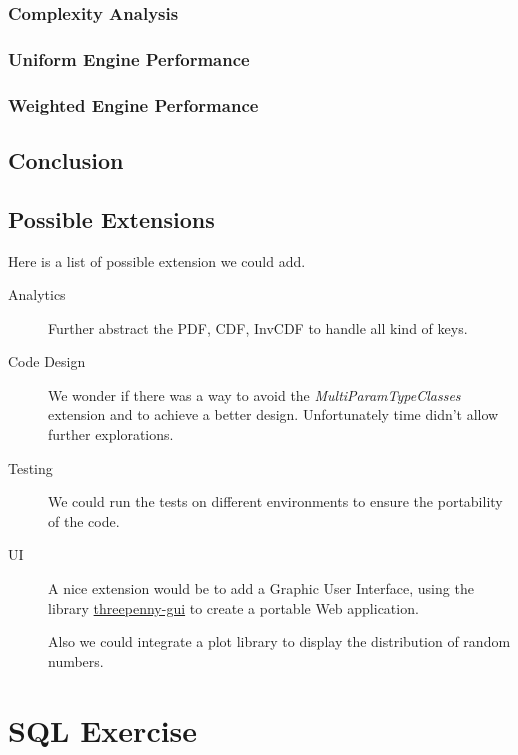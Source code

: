\documentclass[12pt,a4paper,article]{memoir} %
\begin{document}
\subsection{Complexity Analysis}

\subsection{Uniform Engine Performance}

\subsection{Weighted Engine Performance}

\section{Conclusion}

\section{Possible Extensions}
Here is a list of possible extension we could add.
\begin{description}
	\item [Analytics]
	Further abstract the PDF, CDF, InvCDF to handle all kind of keys.
	\item [Code Design]
	We wonder if there was a way to avoid the \emph{MultiParamTypeClasses}
	extension and to achieve a better design. 
	Unfortunately time didn't allow further explorations.
	\item [Testing]
	We could run the tests on different environments to ensure the portability of 
	the code.
	\item [UI] 
	A nice extension would be to add a Graphic User Interface,
	using the library 
	\href{https://hackage.haskell.org/package/threepenny-gui}{threepenny-gui}
	to create a portable Web application. 

	Also we could integrate a plot library to display the distribution of 
	random numbers.
\end{description}

\newpage
\chapter{SQL Exercise}
\end{document}

